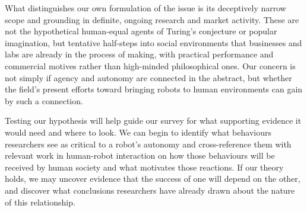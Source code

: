 \documentclass{sfuthesis}
\begin{document}
What distinguishes our own formulation of the issue is its deceptively narrow scope and grounding in definite, ongoing research and market activity. These are not the hypothetical human-equal agents of Turing's conjecture or popular imagination, but tentative half-steps into social environments that businesses and labs are already in the process of making, with practical performance and commercial motives rather than high-minded philosophical ones. Our concern is not simply if agency and autonomy are connected in the abstract, but whether the field's present efforts toward bringing robots to human environments can gain by such a connection.

Testing our hypothesis will help guide our survey for what supporting evidence it would need and where to look. We can begin to identify what behaviours researchers see as critical to a robot's autonomy and cross-reference them with relevant work in human-robot interaction on how those behaviours will be received by human society and what motivates those reactions. If our theory holds, we may uncover evidence that the success of one will depend on the other, and discover what conclusions researchers have already drawn about the nature of this relationship.










\end{document}
